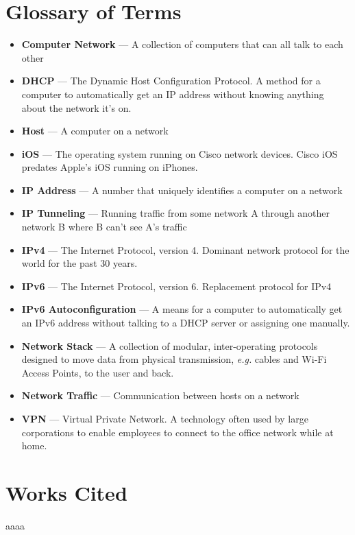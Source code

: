 \documentclass[12pt]{article}
\begin{document}
\section{Glossary of Terms}

\begin{itemize}
\item[] \textbf{Computer Network} --- A collection of computers that can all talk to each other
\item[] \textbf{DHCP} --- The Dynamic Host Configuration Protocol. A method for a computer to automatically get an IP address without knowing anything about the network it's on.
\item[] \textbf{Host} --- A computer on a network
\item[] \textbf{iOS} --- The operating system running on Cisco network devices. Cisco iOS predates Apple's iOS running on iPhones.
\item[] \textbf{IP Address} --- A number that uniquely identifies a computer on a network
\item[] \textbf{IP Tunneling} --- Running traffic from some network A  through another network B where B can't see A's traffic
\item[] \textbf{IPv4} --- The Internet Protocol, version 4. Dominant network protocol for the world for the past 30 years.
\item[] \textbf{IPv6} --- The Internet Protocol, version 6. Replacement protocol for IPv4
\item[] \textbf{IPv6 Autoconfiguration} --- A means for a computer to automatically get an IPv6 address without talking to a DHCP server or assigning one manually.
\item[] \textbf{Network Stack} --- A collection of modular, inter-operating protocols designed to move data from physical transmission, \textit{e.g.} cables and Wi-Fi Access Points, to the user and back.
\item[] \textbf{Network Traffic} --- Communication between hosts on a network
\item[] \textbf{VPN} --- Virtual Private Network. A technology often used by large corporations to enable employees to connect to the office network while at home.
\end{itemize}

\section{Works Cited}
aaaa

\begingroup
\let\clearpage\relax
\end{document}
